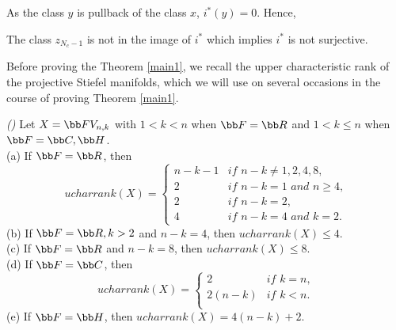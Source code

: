 As the class $y$ is pullback of the class $x$, $i^*(y)=0$. Hence,
\begin{remark}
The class $z_{N_c-1}$ is not in the image of $i^*$ which implies $i^*$ is not surjective.
\end{remark}
Before proving the Theorem \ref{main1}, we recall the upper characteristic rank of the projective Stiefel manifolds, which we will use on several occasions in the course of proving Theorem \ref{main1}.
 \begin{theorem}{\em (\cite[Theorem 1.1]{KNT2012})}\label{KNT_main}
     Let $X=\bb FV_{n, k}$ with $1<k<n$ when $\bb F=\bb R$ and $1<k\leq n$ when $\bb F=\bb C, \bb H$.\\
     (a) If $\bb F=\bb R$, then
     \[ucharrank(X)=\begin{cases}
         n-k-1 & \textit{if $n-k\neq 1, 2, 4, 8,$}\\
         2     & \textit{if $n-k= 1$ and $n\geq 4$,}\\
         2     & \textit{if $n-k= 2$,}\\
         4     & \textit{if $n-k= 4$ and $k=2$.}
     \end{cases}\]
     (b) If $\bb F=\bb R, k>2$ and $n-k=4$, then $ucharrank(X)\leq 4$.\\
     (c) If $\bb F=\bb R$ and $n-k=8$, then $ucharrank(X)\leq 8$.\\
     (d) If $\bb F=\bb C$, then
     \[ucharrank(X)=\begin{cases}
         2     & \textit{if $k=n$,}\\
         2(n-k)     & \textit{if $k<n$.}\\
     \end{cases}\]
     (e) If $\bb F=\bb H$, then $ucharrank(X)= 4(n-k)+2$.\\
 \end{theorem}




